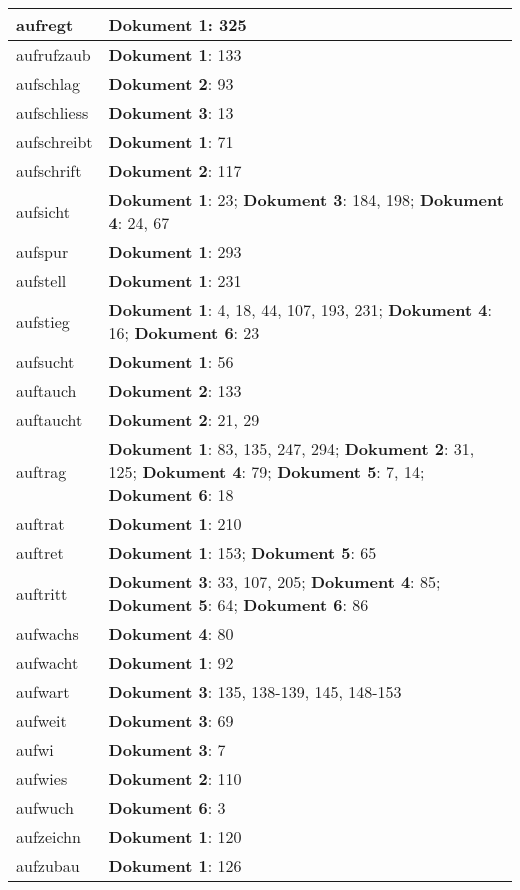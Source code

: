 \documentclass[a5paper]{article}
\begin{document}
\begin{longtable}[l]{|l|p{3in}|}
\hline
aufregt & \textbf{Dokument 1}: 325 \\
\hline
aufrufzaub & \textbf{Dokument 1}: 133 \\
\hline
aufschlag & \textbf{Dokument 2}: 93 \\
\hline
aufschliess & \textbf{Dokument 3}: 13 \\
\hline
aufschreibt & \textbf{Dokument 1}: 71 \\
\hline
aufschrift & \textbf{Dokument 2}: 117 \\
\hline
aufsicht & \textbf{Dokument 1}: 23; \textbf{Dokument 3}: 184, 198; \textbf{Dokument 4}: 24, 67 \\
\hline
aufspur & \textbf{Dokument 1}: 293 \\
\hline
aufstell & \textbf{Dokument 1}: 231 \\
\hline
aufstieg & \textbf{Dokument 1}: 4, 18, 44, 107, 193, 231; \textbf{Dokument 4}: 16; \textbf{Dokument 6}: 23 \\
\hline
aufsucht & \textbf{Dokument 1}: 56 \\
\hline
auftauch & \textbf{Dokument 2}: 133 \\
\hline
auftaucht & \textbf{Dokument 2}: 21, 29 \\
\hline
auftrag & \textbf{Dokument 1}: 83, 135, 247, 294; \textbf{Dokument 2}: 31, 125; \textbf{Dokument 4}: 79; \textbf{Dokument 5}: 7, 14; \textbf{Dokument 6}: 18 \\
\hline
auftrat & \textbf{Dokument 1}: 210 \\
\hline
auftret & \textbf{Dokument 1}: 153; \textbf{Dokument 5}: 65 \\
\hline
auftritt & \textbf{Dokument 3}: 33, 107, 205; \textbf{Dokument 4}: 85; \textbf{Dokument 5}: 64; \textbf{Dokument 6}: 86 \\
\hline
aufwachs & \textbf{Dokument 4}: 80 \\
\hline
aufwacht & \textbf{Dokument 1}: 92 \\
\hline
aufwart & \textbf{Dokument 3}: 135, 138-139, 145, 148-153 \\
\hline
aufweit & \textbf{Dokument 3}: 69 \\
\hline
aufwi & \textbf{Dokument 3}: 7 \\
\hline
aufwies & \textbf{Dokument 2}: 110 \\
\hline
aufwuch & \textbf{Dokument 6}: 3 \\
\hline
aufzeichn & \textbf{Dokument 1}: 120 \\
\hline
aufzubau & \textbf{Dokument 1}: 126 \\

\end{longtable}
\end{document}
